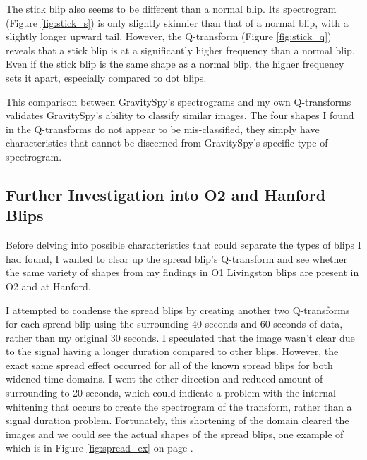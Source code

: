 \documentclass[a4paper]{article}
\begin{document}
The stick blip also seems to be different than a normal blip. Its spectrogram (Figure \ref{fig:stick_s}) is only slightly skinnier than that of a normal blip, with a slightly longer upward tail. However, the Q-transform (Figure \ref{fig:stick_q}) reveals that a stick blip is at a significantly higher frequency than a normal blip. Even if the stick blip is the same shape as a normal blip, the higher frequency sets it apart, especially compared to dot blips.

This comparison between GravitySpy's spectrograms and my own Q-transforms validates GravitySpy's ability to classify similar images. The four shapes I found in the Q-transforms do not appear to be mis-classified, they simply have characteristics that cannot be discerned from GravitySpy's specific type of spectrogram. 

\subsection{Further Investigation into O2 and Hanford Blips} \label{O2}

Before delving into possible characteristics that could separate the types of blips I had found, I wanted to clear up the spread blip's Q-transform and see whether the same variety of shapes from my findings in O1 Livingston blips are present in O2 and at Hanford.

I attempted to condense the spread blips by creating another two Q-transforms for each spread blip using the surrounding 40 seconds and 60 seconds of data, rather than my original 30 seconds. I speculated that the image wasn't clear due to the signal having a longer duration compared to other blips. However, the exact same spread effect occurred for all of the known spread blips for both widened time domains. I went the other direction and reduced amount of surrounding to 20 seconds, which could indicate a problem with the internal whitening that occurs to create the spectrogram of the transform, rather than a signal duration problem. Fortunately, this shortening of the domain cleared the images and we could see the actual shapes of the spread blips, one example of which is in Figure \ref{fig:spread_ex} on page \pageref{fig:spread_ex}.
\end{document}
